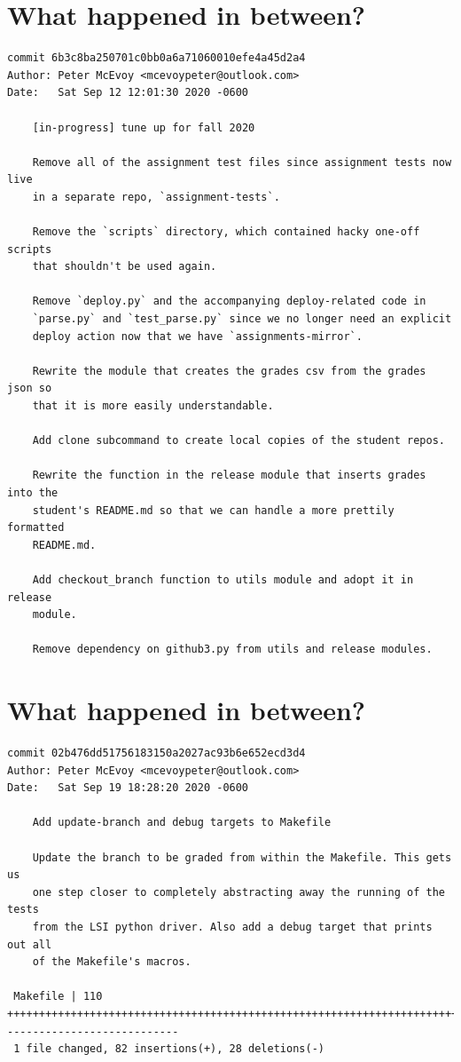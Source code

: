 \documentclass{article}
\begin{document}
\section*{What happened in between?}
\vspace{2ex}
\begin{verbatim}
commit 6b3c8ba250701c0bb0a6a71060010efe4a45d2a4
Author: Peter McEvoy <mcevoypeter@outlook.com>
Date:   Sat Sep 12 12:01:30 2020 -0600

    [in-progress] tune up for fall 2020
    
    Remove all of the assignment test files since assignment tests now live
    in a separate repo, `assignment-tests`.
    
    Remove the `scripts` directory, which contained hacky one-off scripts
    that shouldn't be used again.
    
    Remove `deploy.py` and the accompanying deploy-related code in
    `parse.py` and `test_parse.py` since we no longer need an explicit
    deploy action now that we have `assignments-mirror`.
    
    Rewrite the module that creates the grades csv from the grades json so
    that it is more easily understandable.
    
    Add clone subcommand to create local copies of the student repos.
    
    Rewrite the function in the release module that inserts grades into the
    student's README.md so that we can handle a more prettily formatted
    README.md.
    
    Add checkout_branch function to utils module and adopt it in release
    module.
    
    Remove dependency on github3.py from utils and release modules.
\end{verbatim}

\newpage

\section*{What happened in between?}
\vspace{2ex}
\begin{verbatim}
commit 02b476dd51756183150a2027ac93b6e652ecd3d4
Author: Peter McEvoy <mcevoypeter@outlook.com>
Date:   Sat Sep 19 18:28:20 2020 -0600

    Add update-branch and debug targets to Makefile
    
    Update the branch to be graded from within the Makefile. This gets us
    one step closer to completely abstracting away the running of the tests
    from the LSI python driver. Also add a debug target that prints out all
    of the Makefile's macros.

 Makefile | 110 ++++++++++++++++++++++++++++++++++++++++++++++++++++++++++++++++++++++++++++++++++----------------------------
 1 file changed, 82 insertions(+), 28 deletions(-)

\end{verbatim}
\end{document}
